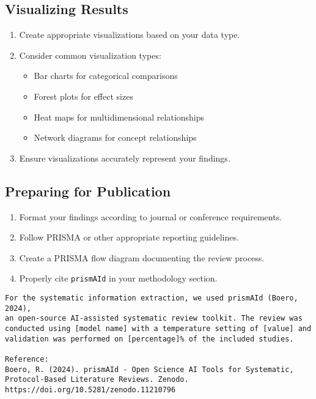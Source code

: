 \subsection{Visualizing Results}

\begin{enumerate}
    \item Create appropriate visualizations based on your data type.
    \item Consider common visualization types:
    \begin{itemize}
        \item Bar charts for categorical comparisons
        \item Forest plots for effect sizes
        \item Heat maps for multidimensional relationships
        \item Network diagrams for concept relationships
    \end{itemize}
    \item Ensure visualizations accurately represent your findings.
\end{enumerate}


\subsection{Preparing for Publication}

\begin{enumerate}
    \item Format your findings according to journal or conference requirements.
    \item Follow PRISMA or other appropriate reporting guidelines.
    \item Create a PRISMA flow diagram documenting the review process.
    \item Properly cite \texttt{prismAId} in your methodology section.
\end{enumerate}

\begin{commandbox}
\begin{lstlisting}
For the systematic information extraction, we used prismAId (Boero, 2024),
an open-source AI-assisted systematic review toolkit. The review was
conducted using [model name] with a temperature setting of [value] and
validation was performed on [percentage]% of the included studies.

Reference:
Boero, R. (2024). prismAId - Open Science AI Tools for Systematic,
Protocol-Based Literature Reviews. Zenodo.
https://doi.org/10.5281/zenodo.11210796
\end{lstlisting}
\end{commandbox}

